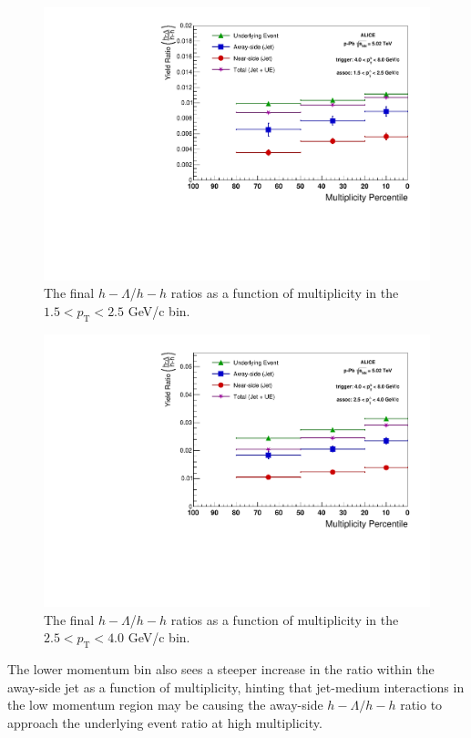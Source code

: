 \documentclass[ALICE,manyauthors]{ALICE_analysis_notes}
\begin{document}
\begin{figure}[ht]
\centering
\includegraphics[width=5in]{figures/v0_ratio_plot_15_25.pdf}
\caption{The final $h-\Lambda$/$h-h$ ratios as a function of multiplicity in the $1.5 < p_{\text{T}} < 2.5$ GeV/c bin.}
\label{low_momentum_ratio}
\end{figure}

\begin{figure}[ht]
\centering
\includegraphics[width=5in]{figures/v0_ratio_plot_25_40.pdf}
\caption{The final $h-\Lambda$/$h-h$ ratios as a function of multiplicity in the $2.5 < p_{\text{T}} < 4.0$ GeV/c bin.}
\label{high_momentum_ratio}
\end{figure}

 The lower momentum bin also sees a steeper increase in the ratio within the away-side jet as a function of multiplicity, hinting that jet-medium interactions in the low momentum region may be causing the away-side $h-\Lambda/h-h$ ratio to approach the underlying event ratio at high multiplicity.
\end{document}
